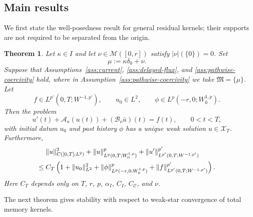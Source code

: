 \documentclass[a4paper,11pt,oneside,reqno]{amsart}
\newtheorem{theorem}{Theorem}[section]
\newcounter{c}
\newcounter{d}
\newcounter{b}
\newcommand{\M}{\mathcal{M}}
\newcommand{\KM}{\mathfrak{M}}
\begin{document}
\subsection{Main results}

We first state the well-posedness result for general residual kernels; their
supports are not required to be separated from the origin.


\begin{theorem}
\label{thm:extension-no-atom}
Let $\kappa\in I$ and let $\nu\in\M([0,r])$ satisfy $|\nu|(\{0\})=0$.
Set
\[
 \mu:=\kappa\delta_0+\nu .
\]
Suppose that Assumptions~\ref{ass:current}, \ref{ass:delayed-flux}, and
\ref{ass:pathwise-coercivity} hold, where in
Assumption~\ref{ass:pathwise-coercivity} we take $\KM=\{\mu\}$.
Let
\[
 f\in L^{p'}(0,T;W^{-1,p'}),\qquad
 u_0\in L^2,\qquad
 \phi\in L^p(-r,0;W^{1,p}_0).
\]
Then the problem
\begin{equation}
 u'(t)+\mathcal A_\kappa(u(t))+(\mathcal B_\nu\bar u)(t)=f(t),
 \qquad 0<t<T,
 \label{eq:no-atom-problem}
\end{equation}
with initial datum \(u_0\) and past history \(\phi\) has a unique weak
solution \(u\in\mathcal X_T\). Furthermore,
\begin{align}
 &\|u\|_{C([0,T];L^2)}^2
 +\|u\|_{L^p(0,T;W^{1,p}_0)}^p
 +\|u'\|_{L^{p'}(0,T;W^{-1,p'})}^{p'}
 \notag\\
 \le{}&
 C_T\left(
 1+\|u_0\|_{L^2}^2
 +\|\phi\|_{L^p(-r,0;W^{1,p}_0)}^p
 +\|f\|_{L^{p'}(0,T;W^{-1,p'})}^{p'}
 \right).
 \label{eq:no-atom-estimate}
\end{align}
Here \(C_T\) depends only on \(T\), \(r\), \(p\), \(\alpha_I\), \(C_I\),
\(C_{\mathcal C}\), and \(\nu\).
\end{theorem}


The next theorem gives stability with respect to weak-star convergence of
total memory kernels.
\end{document}
